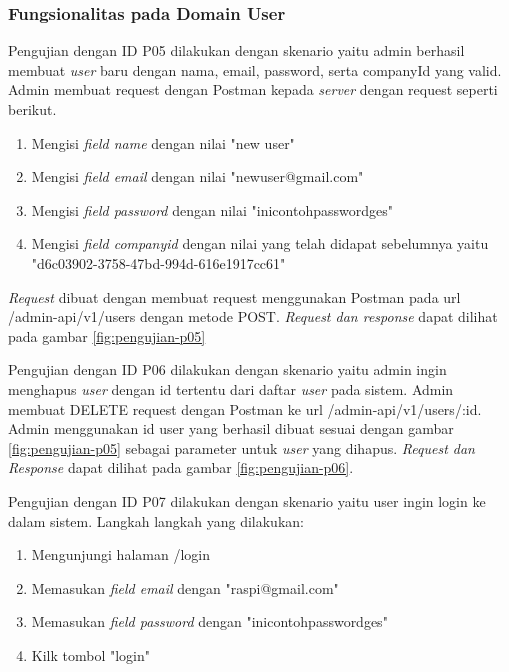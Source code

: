 \subsubsection{Fungsionalitas pada Domain User}

Pengujian dengan ID P05 dilakukan dengan skenario yaitu admin berhasil membuat \textit{user} baru dengan nama, email, password, serta companyId yang valid. Admin membuat request dengan Postman kepada \textit{server} dengan request seperti berikut.

\begin{enumerate}
  \item Mengisi \textit{field name} dengan nilai "new user"
  \item Mengisi \textit{field email} dengan nilai "newuser@gmail.com"
  \item Mengisi \textit{field password} dengan nilai "inicontohpasswordges"
  \item Mengisi \textit{field company\textunderscore id} dengan nilai yang telah didapat sebelumnya yaitu "d6c03902-3758-47bd-994d-616e1917cc61"
\end{enumerate}

\textit{Request} dibuat dengan membuat request menggunakan Postman pada url /admin-api/v1/users dengan metode POST. \textit{Request dan response} dapat dilihat pada gambar \ref{fig:pengujian-p05}


Pengujian dengan ID P06 dilakukan dengan skenario yaitu admin ingin menghapus \textit{user} dengan id tertentu dari daftar \textit{user} pada sistem. Admin membuat DELETE request dengan Postman ke url /admin-api/v1/users/:id. Admin menggunakan id user yang berhasil dibuat sesuai dengan gambar \ref{fig:pengujian-p05} sebagai parameter untuk \textit{user} yang dihapus. \textit{Request dan Response} dapat dilihat pada gambar \ref{fig:pengujian-p06}.

Pengujian dengan ID P07 dilakukan dengan skenario yaitu user ingin login ke dalam sistem. Langkah langkah yang dilakukan:

\begin{enumerate}
  \item Mengunjungi halaman /login
  \item Memasukan \textit{field email} dengan "raspi@gmail.com"
  \item Memasukan \textit{field password} dengan "inicontohpasswordges"
  \item Kilk tombol "login"
\end{enumerate}

